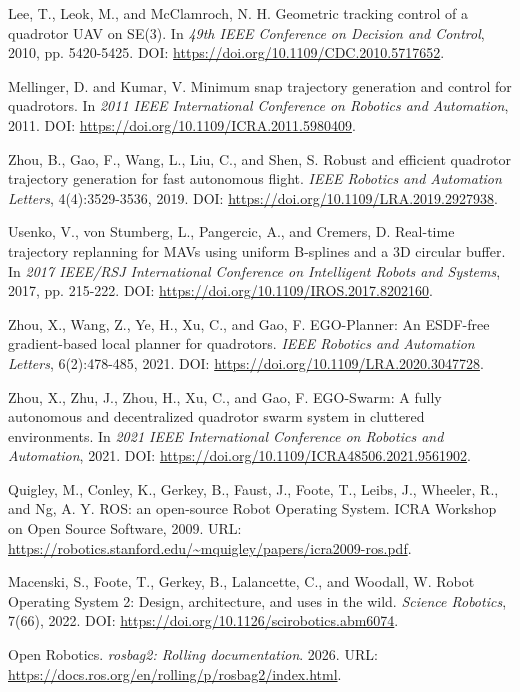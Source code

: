 \documentclass[UTF8,zihao=-4]{ctexart}
\begin{document}
\begin{enumerate}[label={[\arabic*]},leftmargin=2.6em,itemsep=0.2em]
  \item Lee, T., Leok, M., and McClamroch, N. H. Geometric tracking control of a quadrotor UAV on SE(3). In \textit{49th IEEE Conference on Decision and Control}, 2010, pp. 5420-5425. DOI: \url{https://doi.org/10.1109/CDC.2010.5717652}.
  \item Mellinger, D. and Kumar, V. Minimum snap trajectory generation and control for quadrotors. In \textit{2011 IEEE International Conference on Robotics and Automation}, 2011. DOI: \url{https://doi.org/10.1109/ICRA.2011.5980409}.
  \item Zhou, B., Gao, F., Wang, L., Liu, C., and Shen, S. Robust and efficient quadrotor trajectory generation for fast autonomous flight. \textit{IEEE Robotics and Automation Letters}, 4(4):3529-3536, 2019. DOI: \url{https://doi.org/10.1109/LRA.2019.2927938}.
  \item Usenko, V., von Stumberg, L., Pangercic, A., and Cremers, D. Real-time trajectory replanning for MAVs using uniform B-splines and a 3D circular buffer. In \textit{2017 IEEE/RSJ International Conference on Intelligent Robots and Systems}, 2017, pp. 215-222. DOI: \url{https://doi.org/10.1109/IROS.2017.8202160}.
  \item Zhou, X., Wang, Z., Ye, H., Xu, C., and Gao, F. EGO-Planner: An ESDF-free gradient-based local planner for quadrotors. \textit{IEEE Robotics and Automation Letters}, 6(2):478-485, 2021. DOI: \url{https://doi.org/10.1109/LRA.2020.3047728}.
  \item Zhou, X., Zhu, J., Zhou, H., Xu, C., and Gao, F. EGO-Swarm: A fully autonomous and decentralized quadrotor swarm system in cluttered environments. In \textit{2021 IEEE International Conference on Robotics and Automation}, 2021. DOI: \url{https://doi.org/10.1109/ICRA48506.2021.9561902}.
  \item Quigley, M., Conley, K., Gerkey, B., Faust, J., Foote, T., Leibs, J., Wheeler, R., and Ng, A. Y. ROS: an open-source Robot Operating System. ICRA Workshop on Open Source Software, 2009. URL: \url{https://robotics.stanford.edu/~mquigley/papers/icra2009-ros.pdf}.
  \item Macenski, S., Foote, T., Gerkey, B., Lalancette, C., and Woodall, W. Robot Operating System 2: Design, architecture, and uses in the wild. \textit{Science Robotics}, 7(66), 2022. DOI: \url{https://doi.org/10.1126/scirobotics.abm6074}.
  \item Open Robotics. \textit{rosbag2: Rolling documentation}. 2026. URL: \url{https://docs.ros.org/en/rolling/p/rosbag2/index.html}.

\end{enumerate}
\end{document}
